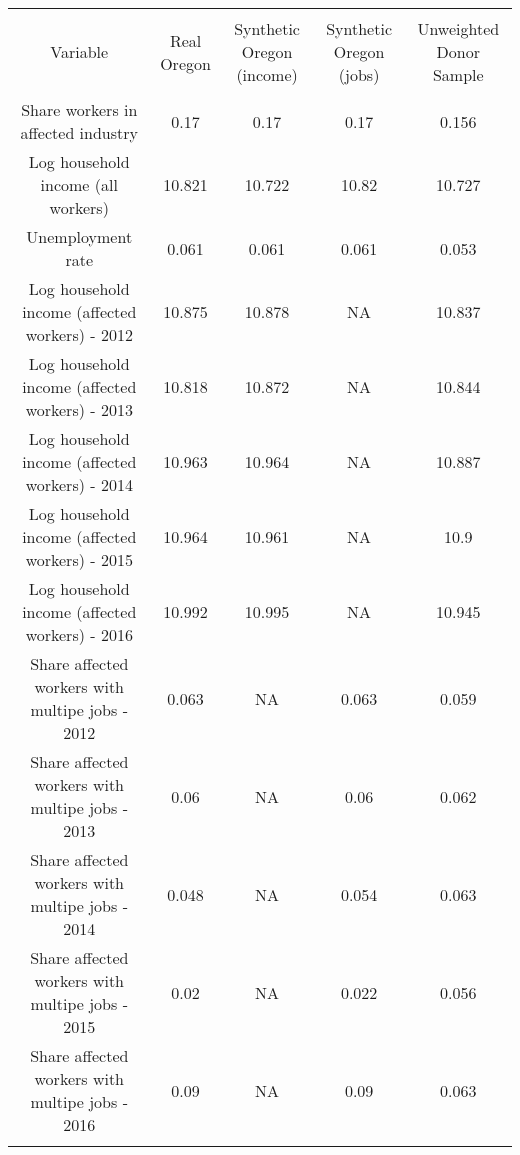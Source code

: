 
\begin{table}[!htbp] \centering 
  \caption{} 
  \label{} 
\begin{tabular}{@{\extracolsep{5pt}} ccccc} 
\\[-1.8ex]\hline 
\hline \\[-1.8ex] 
Variable & Real Oregon & Synthetic Oregon (income) & Synthetic Oregon (jobs) & Unweighted Donor Sample \\ 
\hline \\[-1.8ex] 
Share workers in affected industry & 0.17 & 0.17 & 0.17 & 0.156 \\ 
Log household income (all workers) & 10.821 & 10.722 & 10.82 & 10.727 \\ 
Unemployment rate & 0.061 & 0.061 & 0.061 & 0.053 \\ 
Log household income (affected workers) - 2012 & 10.875 & 10.878 & NA & 10.837 \\ 
Log household income (affected workers) - 2013 & 10.818 & 10.872 & NA & 10.844 \\ 
Log household income (affected workers) - 2014 & 10.963 & 10.964 & NA & 10.887 \\ 
Log household income (affected workers) - 2015 & 10.964 & 10.961 & NA & 10.9 \\ 
Log household income (affected workers) - 2016 & 10.992 & 10.995 & NA & 10.945 \\ 
Share affected workers with multipe jobs - 2012 & 0.063 & NA & 0.063 & 0.059 \\ 
Share affected workers with multipe jobs - 2013 & 0.06 & NA & 0.06 & 0.062 \\ 
Share affected workers with multipe jobs - 2014 & 0.048 & NA & 0.054 & 0.063 \\ 
Share affected workers with multipe jobs - 2015 & 0.02 & NA & 0.022 & 0.056 \\ 
Share affected workers with multipe jobs - 2016 & 0.09 & NA & 0.09 & 0.063 \\ 
\hline \\[-1.8ex] 
\end{tabular} 
\end{table} 
